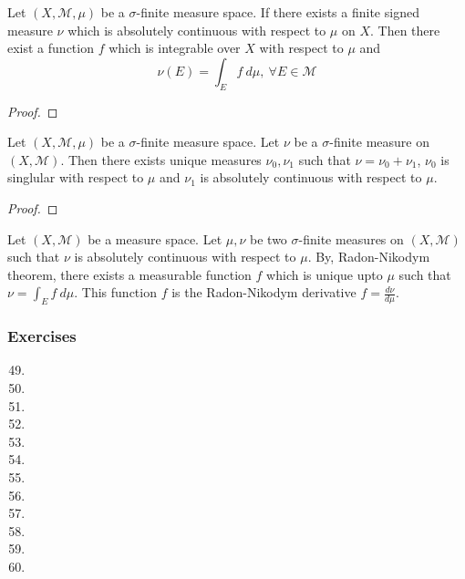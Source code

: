 \begin{theorem}
	Let $(X,\mathcal{M},\mu)$ be a $\sigma$-finite measure space.
	If there exists a finite signed measure $\nu$ which is absolutely continuous with respect to $\mu$ on $X$.
	Then there exist a function $f$ which is integrable over $X$ with respect to $\mu$ and
	\begin{equation}
		\nu(E) = \int_E f \ d\mu,\ \forall E \in \mathcal{M} 
	\end{equation}
\end{theorem}
\begin{proof}
\end{proof}

\begin{theorem}
	Let $(X,\mathcal{M},\mu)$ be a $\sigma$-finite measure space.
	Let $\nu$ be a $\sigma$-finite measure on $(X,\mathcal{M})$.
	Then there exists unique measures $\nu_0,\nu_1$ such that $\nu = \nu_0 + \nu_1$, $\nu_0$ is singlular with respect to $\mu$ and $\nu_1$ is absolutely continuous with respect to $\mu$.
\end{theorem}
\begin{proof}
\end{proof}

\begin{definition}
	Let $(X,\mathcal{M})$ be a measure space.
	Let $\mu,\nu$ be two $\sigma$-finite measures on $(X,\mathcal{M})$ such that $\nu$ is absolutely continuous with respect to $\mu$.
	By, Radon-Nikodym theorem, there exists a measurable function $f$ which is unique upto $\mu$ such that $\nu = \int_E f \ d\mu$.
	This function $f$ is the Radon-Nikodym derivative $f = \frac{d\nu}{d\mu}$.
\end{definition}

\subsubsection{Exercises}
\begin{enumerate}
	\setcounter{enumi}{48}
	\item
	\item
	\item
	\item
	\item
	\item
	\item
	\item
	\item
	\item
	\item
	\item
\end{enumerate}

